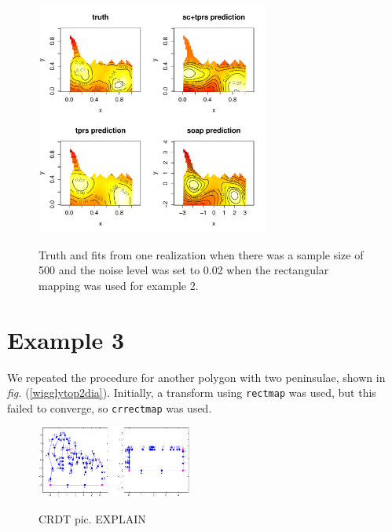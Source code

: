 \documentclass[a4paper,10pt]{amsart}
\newcommand{\fig}[1]{\emph{fig.} (\ref{#1})}
\begin{document}
\begin{figure}
\centering
\includegraphics[width=3in]{figs-otherdomains/wigglytop-real.pdf} \\
\caption{Truth and fits from one realization when there was a sample size of 500 and the noise level was set to 0.02 when the rectangular mapping was used for example 2. }
\label{wigglytop-real}
\end{figure}




\section{Example 3}

We repeated the procedure for another polygon with two peninsulae, shown in \fig{wigglytop2dia}. Initially, a transform using \texttt{rectmap} was used, but this failed to converge, so \texttt{crrectmap} was used.

\begin{figure}
\centering
\includegraphics[width=2in]{figs-otherdomains/wigglytop2-numbered.png} \\
\caption{CRDT pic. EXPLAIN}
\label{wigglytop2-numbered}
\end{figure}
\end{document}
